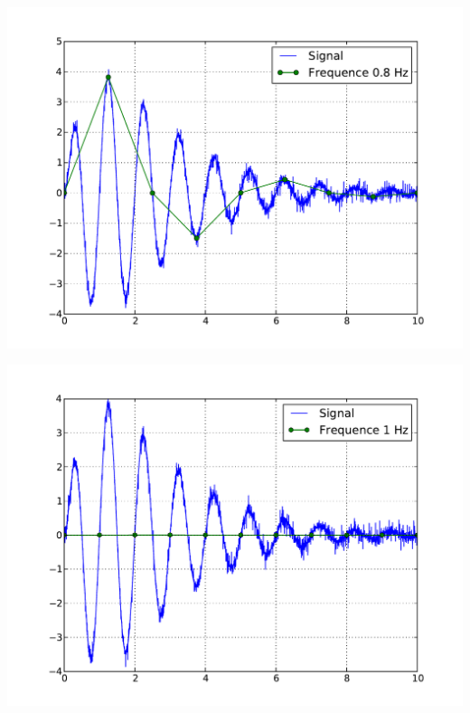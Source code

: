 \documentclass[10pt,fleqn]{article} %
\begin{document}
\begin{minipage}[c]{.43\linewidth}
\begin{center}
\includegraphics[width=\textwidth]{images/ech_1}
\end{center}
\end{minipage} \hfill
\begin{minipage}[c]{.43\linewidth}
\begin{center}
\includegraphics[width=\textwidth]{images/ech_2}
\end{center}
\end{minipage} 
\end{document}
